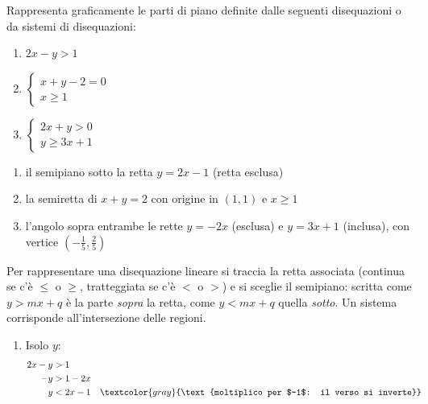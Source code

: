 \begin{question}[ID=1.1, subtitle={Rappresentazione di parti di piano — serie 1}, tags={parti di piano}, difficulty=facile]
Rappresenta graficamente le parti di piano definite dalle seguenti disequazioni o da sistemi di disequazioni:
\vspace{-10pt}
\begin{center}\begin{minipage}{0.7\linewidth}
\begin{enumerate}
\item $2 x - y > 1$
\item $\begin{cases} x + y - 2 = 0 \\ x \ge 1 \end{cases}$
\item $\begin{cases} 2x+y> 0 \\ y \ge 3x+1 \end{cases}$
\end{enumerate}
\end{minipage}\end{center}
\vspace{-20pt}
\begin{solution}
\begin{enumerate}
    \item il semipiano sotto la retta $y=2x-1$ (retta esclusa)
    \item la semiretta di $x+y=2$ con origine in $(1,1)$ e $x\geq1$
    \item l'angolo sopra entrambe le rette $y=-2x$ (esclusa) e $y=3x+1$ (inclusa), con vertice $\left(-\tfrac15,\tfrac25\right)$
\end{enumerate}
\end{solution}
\begin{explanation}
Per rappresentare una disequazione lineare si traccia la retta associata (continua se c'è $\leq$ o $\geq$, tratteggiata se c'è $<$ o $>$) e si sceglie il semipiano: scritta come $y>mx+q$ è la parte \emph{sopra} la retta, come $y<mx+q$ quella \emph{sotto}. Un sistema corrisponde all'intersezione delle regioni.
\begin{enumerate}
    \item Isolo $y$:
    \[\begin{aligned}
    2x-y &> 1\\
    -y &> 1-2x\\
    y &< 2x-1 && \textcolor{gray}{\text{moltiplico per $-1$: il verso si inverte}}

\end{aligned}\]
\end{enumerate}
\end{explanation}
\end{question}

